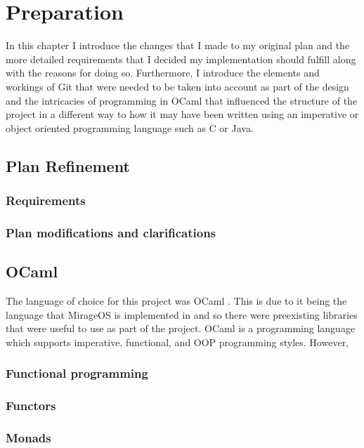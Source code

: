 \chapter{Preparation}

In this chapter I introduce the changes that I made to my original plan and the more detailed requirements that I decided my implementation should fulfill along with the reasons for doing so. Furthermore, I introduce the elements and workings of Git that were needed to be taken into account as part of the design and the intricacies of programming in OCaml that influenced the structure of the project in a different way to how it may have been written using an imperative or object oriented programming language such as C or Java.

\section{Plan Refinement}

\subsection{Requirements}

\subsection{Plan modifications and clarifications}

\section{OCaml}

The language of choice for this project was OCaml \cite{MinskyYaron2013RwO}. This is due to it being the language that MirageOS is implemented in and so there were preexisting libraries that were useful to use as part of the project. OCaml is a programming language which supports imperative, functional, and OOP programming styles. However, 

\subsection{Functional programming}

\subsection{Functors}

\subsection{Monads}

